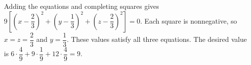 Adding the equations and completing squares gives $9[(x-\dfrac{2}{3})^2+(y-\dfrac{1}{3})^2+(z-\dfrac{2}{3})^2]=0$. Each square is nonnegative, so $x=z=\dfrac{2}{3}$ and $y=\dfrac{1}{3}$. These values satisfy all three equations. The desired value is $6\cdot\dfrac{4}{9}+9\cdot\dfrac{1}{9}+12\cdot\dfrac{4}{9}=\boxed9$.
